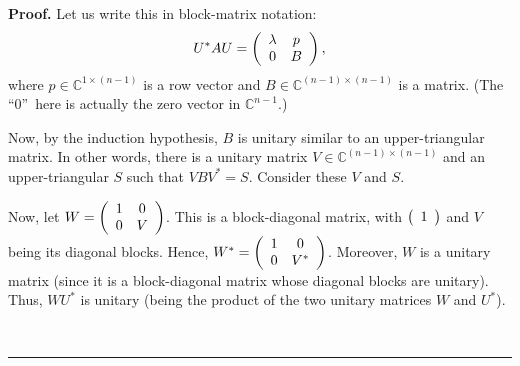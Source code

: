 \documentclass[numbers=enddot,12pt,final,onecolumn,notitlepage]{scrartcl}%
\numberwithin{exer}{subsection}
\theoremstyle{definition}
\newenvironment{proof}[1][Proof]{\noindent\textbf{#1.} }{\ \rule{0.5em}{0.5em}}
\begin{document}
\begin{proof}
Let us write this in block-matrix notation:%
\[
U^{\ast}AU=\left(
\begin{array}
[c]{cc}%
\lambda & p\\
0 & B
\end{array}
\right)  ,
\]
where $p\in\mathbb{C}^{1\times\left(  n-1\right)  }$ is a row vector and
$B\in\mathbb{C}^{\left(  n-1\right)  \times\left(  n-1\right)  }$ is a matrix.
(The \textquotedblleft$0$\textquotedblright\ here is actually the zero vector
in $\mathbb{C}^{n-1}$.)

Now, by the induction hypothesis, $B$ is unitary similar to an
upper-triangular matrix. In other words, there is a unitary matrix
$V\in\mathbb{C}^{\left(  n-1\right)  \times\left(  n-1\right)  }$ and an
upper-triangular $S$ such that $VBV^{\ast}=S$. Consider these $V$ and $S$.

Now, let $W=\left(
\begin{array}
[c]{cc}%
1 & 0\\
0 & V
\end{array}
\right)  $. This is a block-diagonal matrix, with $\left(
\begin{array}
[c]{c}%
1
\end{array}
\right)  $ and $V$ being its diagonal blocks. Hence, $W^{\ast}=\left(
\begin{array}
[c]{cc}%
1 & 0\\
0 & V^{\ast}%
\end{array}
\right)  $. Moreover, $W$ is a unitary matrix (since it is a block-diagonal
matrix whose diagonal blocks are unitary). Thus, $WU^{\ast}$ is unitary (being
the product of the two unitary matrices $W$ and $U^{\ast}$).


\end{proof}
\end{document}
